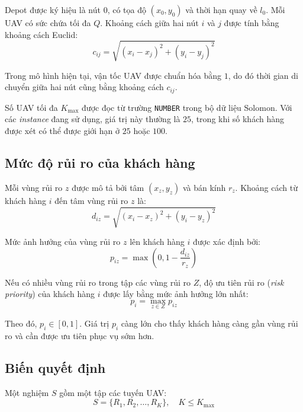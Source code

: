\documentclass{article}
\begin{document}
Depot được ký hiệu là nút $0$, có tọa độ $(x_0, y_0)$ và thời hạn quay về $l_0$. Mỗi UAV có sức chứa tối đa $Q$. Khoảng cách giữa hai nút $i$ và $j$ được tính bằng khoảng cách Euclid:
\begin{equation}
    c_{ij} = \sqrt{(x_i - x_j)^2 + (y_i - y_j)^2}
\end{equation}

Trong mô hình hiện tại, vận tốc UAV được chuẩn hóa bằng $1$, do đó thời gian di chuyển giữa hai nút cũng bằng khoảng cách $c_{ij}$.

Số UAV tối đa $K_{\max}$ được đọc từ trường \texttt{NUMBER} trong bộ dữ liệu Solomon. Với các \textit{instance} đang sử dụng, giá trị này thường là $25$, trong khi số khách hàng được xét có thể được giới hạn ở $25$ hoặc $100$.
\subsection{Mức độ rủi ro của khách hàng}

Mỗi vùng rủi ro $z$ được mô tả bởi tâm $(x_z, y_z)$ và bán kính $r_z$. Khoảng cách từ khách hàng $i$ đến tâm vùng rủi ro $z$ là:
\begin{equation}
    d_{iz} = \sqrt{(x_i - x_z)^2 + (y_i - y_z)^2}
\end{equation}

Mức ảnh hưởng của vùng rủi ro $z$ lên khách hàng $i$ được xác định bởi:
\begin{equation}
    p_{iz} = \max \left( 0, 1 - \frac{d_{iz}}{r_z} \right)
\end{equation}

Nếu có nhiều vùng rủi ro trong tập các vùng rủi ro $Z$, độ ưu tiên rủi ro (\textit{risk priority}) của khách hàng $i$ được lấy bằng mức ảnh hưởng lớn nhất:
\begin{equation}
    p_i = \max_{z \in Z} p_{iz}
\end{equation}

Theo đó, $p_i \in [0, 1]$. Giá trị $p_i$ càng lớn cho thấy khách hàng càng gần vùng rủi ro và cần được ưu tiên phục vụ sớm hơn.

\subsection{Biến quyết định}

Một nghiệm $S$ gồm một tập các tuyến UAV:
\begin{equation}
    S = \{ R_1, R_2, \dots, R_K \}, \quad K \le K_{\max}
\end{equation}
\end{document}
